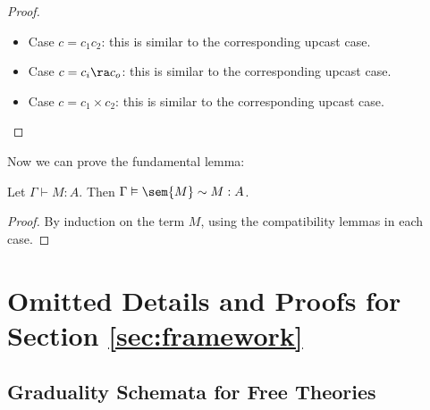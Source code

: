 \begin{proof}
\begin{itemize}
        We have that $p_{\iarr}(\eta\, \iarr(h)) = \theta(\nxt(\eta\, h))$, i.e., a
        step is inserted. We also know that $\dnc {\iarr} (\upc {\iarr} V_f)
        \stepsin{1} V_f$. Thus, by anti-reduction for true steps (Lemma
        \ref{lem:anti-reduction-true}), it suffices to show that
        \[ \later_t(\erel{\dyntodyn}{(\nxt(\eta\, h))_t}{V_f}), \]
        i.e.,
        \[ \later (\erel{\dyntodyn}{(\eta\, h)}{V_f}). \]
        This follows from the fact that $\later (\vrel{\dyntodyn}{h}{V_f})$.

        \item Case $c = c_1 c_2$: this is similar to the corresponding upcast case.
        \item Case $c = c_i \ra c_o$: this is similar to the corresponding upcast case.
        \item Case $c = c_1 \times c_2$: this is similar to the corresponding upcast case.
    \end{itemize}


\end{proof}


Now we can prove the fundamental lemma:
\begin{lemma}
  Let $\Gamma \vdash M : A$. Then $\Gamma \vDash \sem{M} \sim M : A$.
\end{lemma}
\begin{proof}
    By induction on the term $M$, using the compatibility lemmas in each case.
\end{proof}




\section{Omitted Details and Proofs for Section \ref{sec:framework}}

\subsection{Graduality Schemata for Free Theories}

